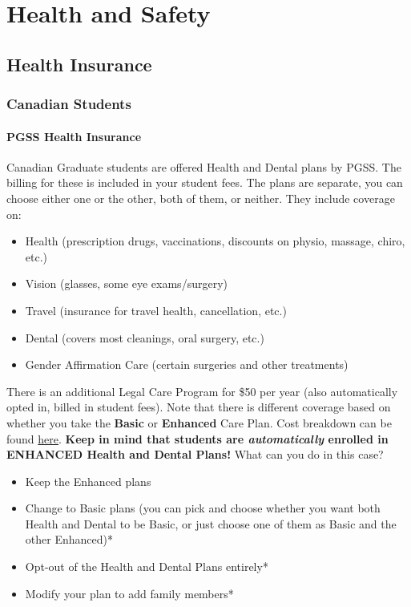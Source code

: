 
\chapter{Health and Safety}

    \section{Health Insurance} 
    
\subsection{Canadian Students}

\subsubsection{PGSS Health Insurance}
    Canadian Graduate students are offered Health and Dental plans by PGSS. The billing for these is included in your student fees. The plans are separate, you can choose either one or the other, both of them, or neither. They include coverage on:
    \begin{itemize}
        \item Health (prescription drugs, vaccinations, discounts on physio, massage, chiro, etc.)
        \item Vision (glasses, some eye exams/surgery)
        \item Travel (insurance for travel health, cancellation, etc.)
        \item Dental (covers most cleanings, oral surgery, etc.)
        \item Gender Affirmation Care (certain surgeries and other treatments)
    \end{itemize}

    There is an additional Legal Care Program for \$50 per year (also automatically opted in, billed in student fees). Note that there is different coverage based on whether you take the \textbf{Basic} or \textbf{Enhanced} Care Plan. Cost breakdown can be found \href{https://studentcare.ca/rte/en/McGillUniversitygraduatestudentsPGSS_Cost_HowMuchDoesItCost}{here}.
    \textbf{Keep in mind that students are \textit{automatically} enrolled in ENHANCED Health and Dental Plans!} What can you do in this case?
    \begin{itemize}
        \item Keep the Enhanced plans
        \item Change to Basic plans (you can pick and choose whether you want both Health and Dental to be Basic, or just choose one of them as Basic and the other Enhanced)*
        \item Opt-out of the Health and Dental Plans entirely*
        \item Modify your plan to add family members*
    \end{itemize}

